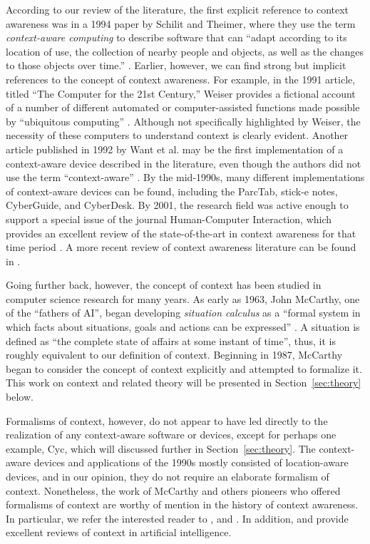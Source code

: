 According to our review of the literature, the first explicit reference to context awareness was in a 1994 paper by Schilit and Theimer, where they use the term \emph{context-aware computing} to describe software that can ``adapt according to its location of use, the collection of nearby people and objects, as well as the changes to those objects over time.'' \cite{schilit1994disseminating}. Earlier, however, we can find strong but implicit references to the concept of context awareness. For example, in the 1991 article, titled ``The Computer for the 21st Century,'' Weiser provides a fictional account of a number of different automated or computer-assisted functions made possible by ``ubiquitous computing'' \cite{weiser1991computer}. Although not specifically highlighted by Weiser, the necessity of these computers to understand context is clearly evident. Another article published in 1992 by Want et al. may be the first implementation of a context-aware device described in the literature, even though the authors did not use the term ``context-aware'' \cite{want1992active}. By the mid-1990s, many different implementations of context-aware devices can be found, including the ParcTab, stick-e notes, CyberGuide, and CyberDesk. By 2001, the research field was active enough to support a special issue of the journal Human-Computer Interaction, which provides an excellent review of the state-of-the-art in context awareness for that time period \cite{moran2001introduction}. A more recent review of context awareness literature can be found in \cite{Hong2009}.

Going further back, however, the concept of context has been studied in computer science research for many years. As early as 1963, John McCarthy, one of the ``fathers of AI'', began developing \emph{situation calculus} as a ``formal system in which facts about situations, goals and actions can be expressed'' \cite{mccarthy1963programs}. A situation is defined as ``the complete state of affairs at some instant of time'', thus, it is roughly equivalent to our definition of context. Beginning in 1987, McCarthy began to consider the concept of context explicitly and attempted to formalize it. This work on context and related theory will be presented in Section~\ref{sec:theory} below.

Formalisms of context, however, do not appear to have led directly to the realization of any context-aware software or devices, except for perhaps one example, Cyc, which will discussed further in Section~\ref{sec:theory}. The context-aware devices and applications of the 1990s mostly consisted of location-aware devices, and in our opinion, they do not require an elaborate formalism of context. Nonetheless, the work of McCarthy and others pioneers who offered formalisms of context are worthy of mention in the history of context awareness. In particular, we refer the interested reader to \cite{McCarthy1993} \cite{guha1991contexts} \cite{mccarthy1997formalizing} \cite{akman1996steps}, and \cite{buvac1993propositional}. In addition, \cite{brezillon1999context} and \cite{akman2002context} provide excellent reviews of context in artificial intelligence.

